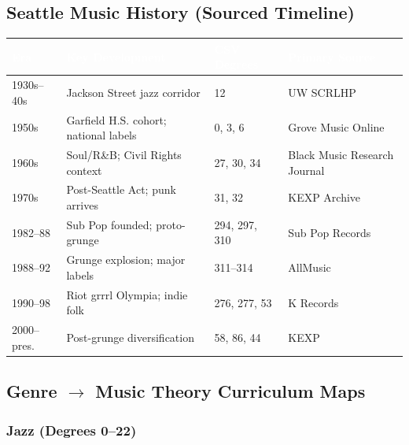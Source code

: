 \documentclass[11pt,letterpaper]{article}
\newcommand{\tblhdr}[1]{\textbf{\sffamily\textcolor{white}{#1}}}
\begin{document}
\subsection{Seattle Music History (Sourced Timeline)}

\begin{center}
\begin{tabularx}{\textwidth}{L{1.8cm}L{5.2cm}L{3.5cm}X}
\toprule
{}
\tblhdr{Era} & \tblhdr{Key Development} & \tblhdr{CSV Degrees} & \tblhdr{Primary Source} \\
\midrule
1930s--40s & Jackson Street jazz corridor & 12 & UW SCRLHP \\
1950s & Garfield H.S. cohort; national labels & 0, 3, 6 & Grove Music Online \\
1960s & Soul/R\&B; Civil Rights context & 27, 30, 34 & Black Music Research Journal \\
1970s & Post-Seattle Act; punk arrives & 31, 32 & KEXP Archive \\
1982--88 & Sub Pop founded; proto-grunge & 294, 297, 310 & Sub Pop Records \\
1988--92 & Grunge explosion; major labels & 311--314 & AllMusic \\
1990--98 & Riot grrrl Olympia; indie folk & 276, 277, 53 & K Records \\
2000--pres. & Post-grunge diversification & 58, 86, 44 & KEXP \\
\bottomrule
\end{tabularx}
\end{center}

\subsection{Genre $\rightarrow$ Music Theory Curriculum Maps}

\subsubsection{Jazz (Degrees 0--22)}
\end{document}
